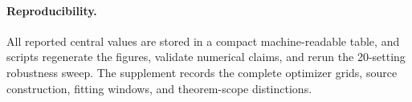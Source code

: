 \paragraph{Reproducibility.}
All reported central values are stored in a compact machine-readable table, and scripts regenerate the figures, validate numerical claims, and rerun the 20-setting robustness sweep.  The supplement records the complete optimizer grids, source construction, fitting windows, and theorem-scope distinctions.


